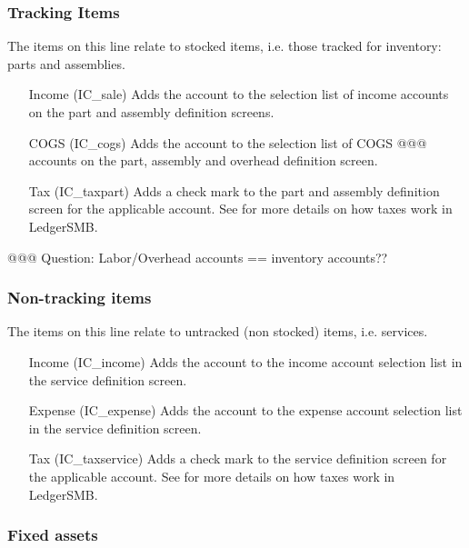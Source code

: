 \subsubsection{Tracking Items}
\label{subsubsec-coa-tracking-items}

The items on this line relate to stocked items, i.e. those tracked for inventory: parts and
assemblies.

\begin{enumerate}
\item[Income (IC\_sale)] Adds the account to the selection list of income accounts on the
   part and assembly definition screens.
\item[COGS (IC\_cogs)] Adds the account to the selection list of COGS @@@ accounts on the
   part, assembly and overhead definition screen.
\item[Tax (IC\_taxpart)] Adds a check mark to the part and assembly definition screen
   for the applicable account. See  for more details on how taxes
   work in LedgerSMB.
\end{enumerate}

@@@ Question: Labor/Overhead accounts == inventory accounts??

\subsubsection{Non-tracking items}
\label{subsubsec-coa-non-tracking-items}

The items on this line relate to untracked (non stocked) items, i.e. services.

\begin{enumerate}
\item[Income (IC\_income)] Adds the account to the income account selection list in
   the service definition screen.
\item[Expense (IC\_expense)] Adds the account to the expense account selection list in
   the service definition screen.
\item[Tax (IC\_taxservice)] Adds a check mark to the service definition screen for the
   applicable account. See  for more details on how taxes work in LedgerSMB.
\end{enumerate}

\subsubsection{Fixed assets}
\label{subsubsec-coa-fixed-assets}


